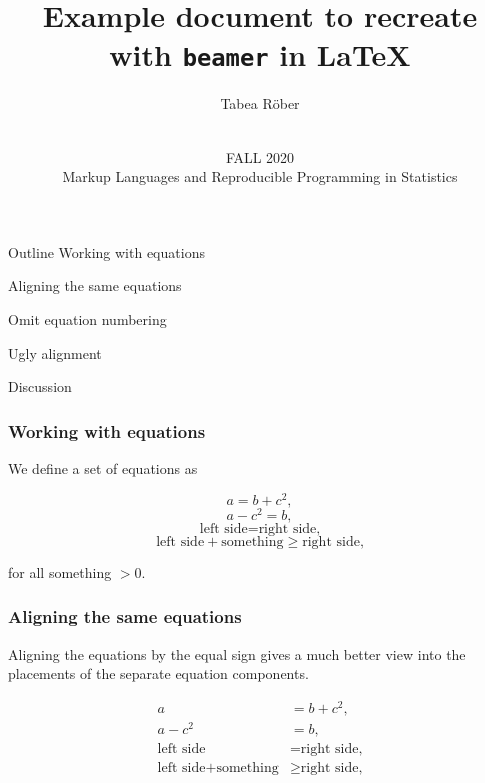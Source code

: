 \documentclass[aspectratio=169]{beamer}
\title[]{Example document to recreate with \texttt{beamer} in \LaTeX}
\author[T. Röber]{Tabea Röber}
\date[]{\vspace{0.5 in}\\ FALL 2020 \\ Markup Languages and Reproducible Programming in Statistics  \vskip6mm}
\begin{document}
\begin{frame}[plain]
\vspace{0.5 in}
  \titlepage
\end{frame}

\begin{frame}{Outline}
Working with equations
  \begin{description}
    \item Aligning the same equations
    \item Omit equation numbering
    \item Ugly alignment
  \end{description}
 \vspace{0.4 in}
Discussion
\end{frame}



\begin{frame}
  \frametitle{Working with equations}
We define a set of equations as

\begin{equation}
a = b + c^2, 
\end{equation}
\begin{equation}
a - c^2 = b, 
\end{equation}
\begin{equation}
\text{left side} = \text{right side,} 
\end{equation}
\begin{equation}
\text{left side} + \text{something} \geq \text{right side,}
\end{equation}

for all something $ > 0 $.
 \end{frame}


\begin{frame}
  \frametitle{Aligning the same equations}
Aligning the equations by the equal sign gives a much better view into the placements of the separate equation components.

\begin{align}
a &= b + c^2, \\
a - c^2 &= b, \\
\text{left side} &= \text{right side,} \\
\text{left side} + \text{something} &\geq \text{right side,}
\end{align}

 \end{frame}
\end{document}
